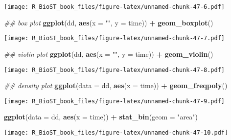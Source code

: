 \documentclass[
]{book}
\newenvironment{Shaded}{\begin{snugshade}}{\end{snugshade}}
\newcommand{\CommentTok}[1]{\textcolor[rgb]{0.56,0.35,0.01}{\textit{#1}}}
\newcommand{\DataTypeTok}[1]{\textcolor[rgb]{0.13,0.29,0.53}{#1}}
\newcommand{\KeywordTok}[1]{\textcolor[rgb]{0.13,0.29,0.53}{\textbf{#1}}}
\newcommand{\NormalTok}[1]{#1}
\newcommand{\OperatorTok}[1]{\textcolor[rgb]{0.81,0.36,0.00}{\textbf{#1}}}
\newcommand{\StringTok}[1]{\textcolor[rgb]{0.31,0.60,0.02}{#1}}
\begin{document}
\texttt{[image: R\_BioST\_book\_files/figure-latex/unnamed-chunk-47-6.pdf]}

\begin{Shaded}
\begin{Highlighting}[]
\CommentTok{\#\# box plot}
\KeywordTok{ggplot}\NormalTok{(dd, }\KeywordTok{aes}\NormalTok{(}\DataTypeTok{x =} \StringTok{""}\NormalTok{, }\DataTypeTok{y =}\NormalTok{ time)) }\OperatorTok{+}\StringTok{ }
\StringTok{  }\KeywordTok{geom\_boxplot}\NormalTok{()}
\end{Highlighting}
\end{Shaded}

\texttt{[image: R\_BioST\_book\_files/figure-latex/unnamed-chunk-47-7.pdf]}

\begin{Shaded}
\begin{Highlighting}[]
\CommentTok{\#\# violin plot}
\KeywordTok{ggplot}\NormalTok{(dd, }\KeywordTok{aes}\NormalTok{(}\DataTypeTok{x =} \StringTok{""}\NormalTok{, }\DataTypeTok{y =}\NormalTok{ time)) }\OperatorTok{+}\StringTok{ }
\StringTok{  }\KeywordTok{geom\_violin}\NormalTok{()}
\end{Highlighting}
\end{Shaded}

\texttt{[image: R\_BioST\_book\_files/figure-latex/unnamed-chunk-47-8.pdf]}

\begin{Shaded}
\begin{Highlighting}[]
\CommentTok{\#\# density plot}
\KeywordTok{ggplot}\NormalTok{(}\DataTypeTok{data =}\NormalTok{ dd, }\KeywordTok{aes}\NormalTok{(}\DataTypeTok{x =}\NormalTok{ time)) }\OperatorTok{+}\StringTok{ }
\StringTok{  }\KeywordTok{geom\_freqpoly}\NormalTok{()}
\end{Highlighting}
\end{Shaded}

\texttt{[image: R\_BioST\_book\_files/figure-latex/unnamed-chunk-47-9.pdf]}

\begin{Shaded}
\begin{Highlighting}[]
\KeywordTok{ggplot}\NormalTok{(}\DataTypeTok{data =}\NormalTok{ dd, }\KeywordTok{aes}\NormalTok{(}\DataTypeTok{x =}\NormalTok{ time)) }\OperatorTok{+}\StringTok{ }
\StringTok{  }\KeywordTok{stat\_bin}\NormalTok{(}\DataTypeTok{geom =} \StringTok{"area"}\NormalTok{)}
\end{Highlighting}
\end{Shaded}

\texttt{[image: R\_BioST\_book\_files/figure-latex/unnamed-chunk-47-10.pdf]}
\end{document}
